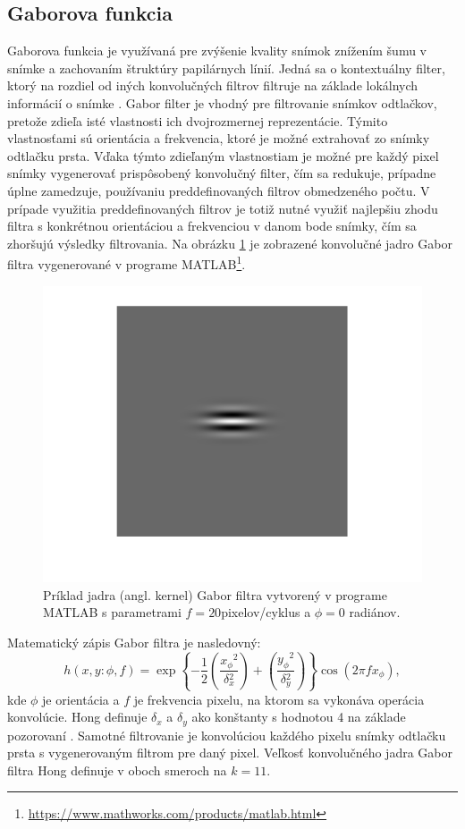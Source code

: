   \subsection{Gaborova funkcia}
  Gaborova funkcia je využívaná pre zvýšenie kvality snímok znížením šumu v snímke a zachovaním štruktúry papilárnych línií. Jedná sa o kontextuálny
  filter, ktorý na rozdiel od iných konvolučných filtrov filtruje na základe lokálnych informácií o snímke \cite{Handbook}. Gabor filter je vhodný
  pre filtrovanie snímkov odtlačkov, pretože zdieľa isté vlastnosti ich dvojrozmernej reprezentácie. Týmito vlastnosťami sú orientácia a frekvencia,
  ktoré je možné extrahovať zo snímky odtlačku prsta. Vďaka týmto zdieľaným vlastnostiam je možné pre každý pixel snímky vygenerovať prispôsobený konvolučný
  filter, čím sa redukuje, prípadne úplne zamedzuje, používaniu preddefinovaných filtrov obmedzeného počtu. V prípade využitia preddefinovaných filtrov je totiž
  nutné využiť najlepšiu zhodu filtra s konkrétnou orientáciou a frekvenciou v danom bode snímky, čím sa zhoršujú výsledky filtrovania.
  Na obrázku \ref{obr:gabor_kernel} je zobrazené konvolučné jadro Gabor filtra vygenerované v programe
  MATLAB\footnote{\href{https://www.mathworks.com/products/matlab.html}{https://www.mathworks.com/products/matlab.html}}.
  
  \begin{figure}[h]
    \centering
    \includegraphics[width=0.25\linewidth]{obrazky-figures/gabor_kernel.png}
    \caption{Príklad jadra (angl. kernel) Gabor filtra vytvorený v programe MATLAB s parametrami $f = 20$pixelov/cyklus a $\phi{} = 0$ radiánov.}
    \label{obr:gabor_kernel}
  \end{figure}
  Matematický zápis Gabor filtra je nasledovný:
  \begin{equation}
    h(x,y: \phi{}, f) = \exp{\left\{ -\frac{1}{2} \left( \frac{x_\phi{}^2}{\delta{}_x^2} \right) + \left( \frac{y_\phi{}^2}{\delta{}_y^2} \right) \right\}} \cos{}\left(2\pi{}fx_\phi{}\right),
  \end{equation}
  kde $\phi{}$ je orientácia a $f$ je frekvencia pixelu, na ktorom sa vykonáva operácia konvolúcie. Hong definuje $\delta{}_x$ a $\delta{}_y$
  ako konštanty s hodnotou 4 na základe pozorovaní \cite{Hong}. Samotné filtrovanie je konvolúciou každého pixelu snímky odtlačku prsta s vygenerovaným filtrom
  pre daný pixel. Veľkosť konvolučného jadra Gabor filtra Hong definuje v oboch smeroch na $k = 11$.

